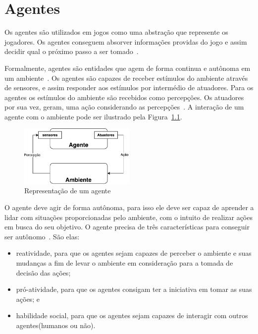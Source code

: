 \chapter{\label{chap:agentes}Agentes} 


Os agentes são utilizados em jogos como uma abstração que represente os jogadores. Os agentes conseguem absorver informações providas do jogo e assim decidir qual o próximo passo a ser tomado~\cite{millington2009artificial}. 

Formalmente, agentes são entidades que agem de forma continua e autônoma em um ambiente~\cite{agent1993oriented}. 
Os agentes são capazes de receber estímulos do ambiente através de sensores, e assim responder aos estímulos por intermédio de atuadores. 
Para os agentes os estímulos do ambiente são recebidos como percepções. 
Os atuadores por sua vez, geram, uma ação considerando as percepções~\cite[Capítulo 7]{intelligence2003modern}. 
A interação de um agente com o ambiente pode ser ilustrado pela Figura~\ref{fig:agente}.

\begin{figure}[ht]
	\centering
	\includegraphics[width=0.5\textwidth]{fig/agente.pdf}
	\caption{Representação de um agente}
	\label{fig:agente}
\end{figure} 

O agente deve agir de forma autônoma, para isso ele deve ser capaz de aprender a lidar com situações proporcionadas pelo ambiente, com o intuito de realizar ações em busca do seu objetivo. O agente precisa de três características para conseguir ser autônomo~\cite{agent1999}. São elas:
 
\begin{itemize}
	\item reatividade, para que os agentes sejam capazes de perceber o ambiente e suas mudanças a fim de levar o ambiente em consideração para a tomada de decisão das ações;
	\item pró-atividade, para que os agentes consigam ter a iniciativa em tomar as suas ações; e
	\item habilidade social, para que os agentes sejam capazes de interagir com outros agentes(humanos ou não).
\end{itemize}

